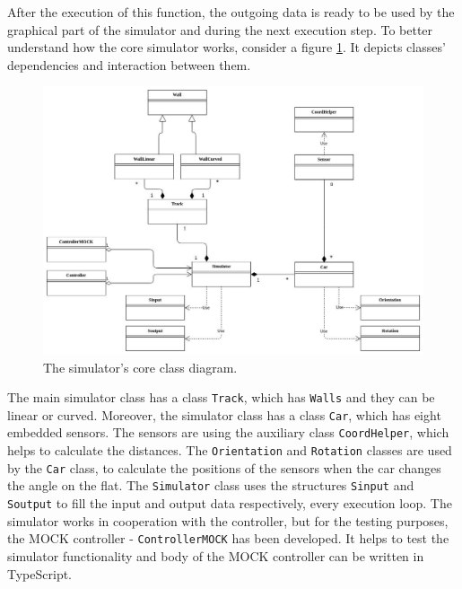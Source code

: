 After the execution of this function, the outgoing data is ready to be used by the graphical part of the simulator and during the next execution step. To better understand how the core simulator works, consider a figure \ref{fig:class-diagram}. It depicts classes' dependencies and interaction between them. \newline
\begin{figure}[h!]
    \centering
    \includegraphics[width=\linewidth]{src/pic/class-diagram}
    \caption{The simulator's core class diagram.}
    \label{fig:class-diagram}
\end{figure} \newline
The main simulator class has a class \texttt{Track}, which has \texttt{Walls} and they can be linear or curved. Moreover, the simulator class has a class \texttt{Car}, which has eight embedded sensors. The sensors are using the auxiliary class \texttt{CoordHelper}, which helps to calculate the distances. The \texttt{Orientation} and \texttt{Rotation} classes are used by the \texttt{Car} class, to calculate the positions of the sensors when the car changes the angle on the flat. The \texttt{Simulator} class uses the structures \texttt{Sinput} and \texttt{Soutput} to fill the input and output data respectively, every execution loop. The simulator works in cooperation with the controller, but for the testing purposes, the MOCK controller - \texttt{ControllerMOCK} has been developed. It helps to test the simulator functionality and body of the MOCK controller can be written in TypeScript.


